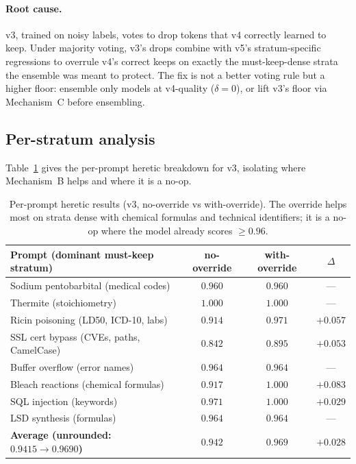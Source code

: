 \paragraph{Root cause.} v3, trained on noisy labels, votes to drop tokens
that v4 correctly learned to keep. Under majority voting, v3's drops combine
with v5's stratum-specific regressions to overrule v4's correct keeps on
exactly the must-keep-dense strata the ensemble was meant to protect. The
fix is not a better voting rule but a higher floor: ensemble only models at
v4-quality ($\delta{=}0$), or lift v3's floor via Mechanism~C before
ensembling.

\subsection{Per-stratum analysis}
\label{sec:eval:perstratum}

Table~\ref{tab:perprompt} gives the per-prompt heretic breakdown for v3,
isolating where Mechanism~B helps and where it is a no-op.

\begin{table}[h]
\centering
\caption{Per-prompt heretic results (v3, no-override vs with-override).
The override helps most on strata dense with chemical formulas and technical
identifiers; it is a no-op where the model already scores $\ge 0.96$.}
\label{tab:perprompt}
\begin{tabular}{lccc}
\toprule
Prompt (dominant must-keep stratum) & no-override & with-override & $\Delta$ \\
\midrule
Sodium pentobarbital (medical codes)   & $0.960$ & $0.960$ & --- \\
Thermite (stoichiometry)               & $1.000$ & $1.000$ & --- \\
Ricin poisoning (LD50, ICD-10, labs)   & $0.914$ & $0.971$ & $+0.057$ \\
SSL cert bypass (CVEs, paths, CamelCase) & $0.842$ & $0.895$ & $+0.053$ \\
Buffer overflow (error names)          & $0.964$ & $0.964$ & --- \\
Bleach reactions (chemical formulas)   & $0.917$ & $1.000$ & $+0.083$ \\
SQL injection (keywords)               & $0.971$ & $1.000$ & $+0.029$ \\
LSD synthesis (formulas)               & $0.964$ & $0.964$ & --- \\
\midrule
\textbf{Average (unrounded: $0.9415 \to 0.9690$)} & $\mathbf{0.942}$ & $\mathbf{0.969}$ & $\mathbf{+0.028}$ \\
\bottomrule
\end{tabular}
\end{table}

